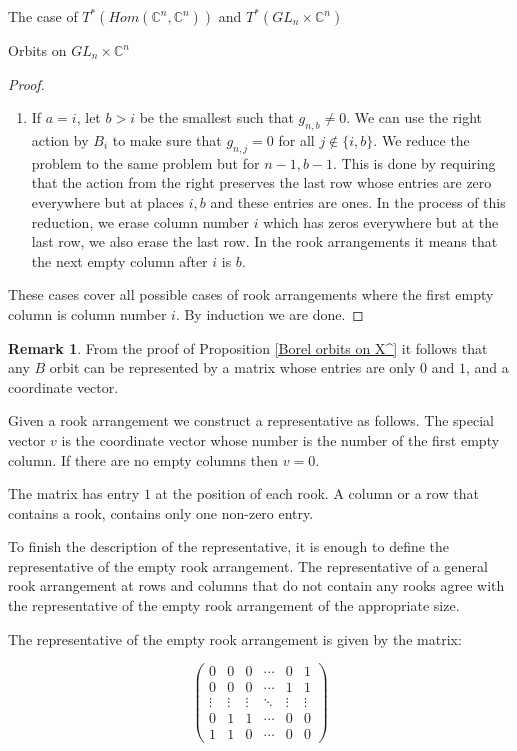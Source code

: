 \documentclass[12pt]{article}
\newcommand{\C}{\mathbb{C}}
\theoremstyle{plain}
\theoremstyle{definition}
\newtheorem{Remark}[theorem]{Remark}
\begin{document}
\begin{subsection}{The case of $T^*(Hom(\C^n,\C^n))$ and $T^*(GL_n\times \C^n)$}
\begin{subsubsection}{Orbits on $GL_n\times \C^n$}
\begin{proof}
\begin{enumerate}
            \item If $a=i$, let $b>i$ be the smallest such that $g_{n,b}\neq 0$. We can use the right action by $B_i$ to make sure that $g_{n,j}=0$ for all $j\notin \{i,b\}$. We reduce the problem to the same problem but for $n-1,b-1$. This is done by requiring that the action from the right preserves the last row whose entries are zero everywhere but at places $i,b$ and these entries are ones. In the process of this reduction, we erase column number $i$ which has zeros everywhere but at the last row, we also erase the last row. In the rook arrangements it means that the next empty column after $i$ is $b$.
        \end{enumerate}

        These cases cover all possible cases of rook arrangements where the first empty column is column number $i$. By induction we are done.
        
        
    \end{proof}
    \begin{Remark}\label{remark: representativie GL_n times V}
        From the proof of Proposition \ref{Borel orbits on X^} it follows that any $B$ orbit can be represented by a matrix whose entries are only $0$ and $1$, and a coordinate vector.

        Given a rook arrangement we construct a representative as follows. The special vector $v$ is the coordinate vector whose number is the number of the first empty column. If there are no empty columns then $v=0$.

        The matrix has entry $1$ at the position of each rook. A column or a row that contains a rook, contains only one non-zero entry.

        To finish the description of the representative, it is enough to define the representative of the empty rook arrangement. The representative of a general rook arrangement at rows and columns that do not contain any rooks agree with the representative of the empty rook arrangement of the appropriate size.
        
        The representative of the empty rook arrangement is given by the matrix:

        $$\begin{pmatrix}
            0& 0 & 0 & \cdots & 0 & 1 \\
            0 & 0 & 0 & \cdots & 1 & 1 \\
            \vdots & \vdots & \vdots & \ddots  & \vdots & \vdots\\
            0 & 1 & 1 & \cdots & 0 & 0 \\
            1 & 1 & 0 & \cdots & 0 & 0
        \end{pmatrix}$$


\end{Remark}
\end{subsubsection}
\end{subsection}
\end{document}
